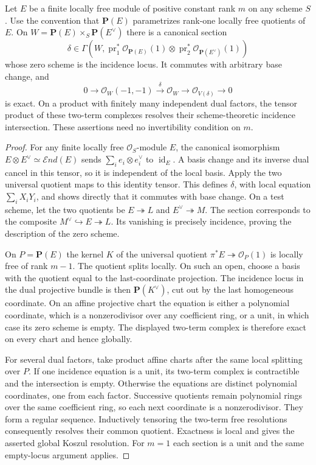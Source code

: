 \begin{lemma}\label{C:determinant-incidence}
Let $E$ be a finite locally free module of positive constant rank
$m$ on any scheme $S$.  Use the convention that $\mathbf P(E)$
parametrizes rank-one locally free quotients of $E$.
On $W=\mathbf P(E)\times_S\mathbf P(E^\vee)$ there is a canonical
section
\[
 \delta\in\Gamma(W,
  \operatorname{pr}_1^*\mathcal O_{\mathbf P(E)}(1)
  \otimes\operatorname{pr}_2^*\mathcal O_{\mathbf P(E^\vee)}(1))
\]
whose zero scheme is the incidence locus.  It commutes with arbitrary
base change, and
\[
 0\longrightarrow\mathcal O_W(-1,-1)
       \xrightarrow{\ \delta\ }\mathcal O_W
       \longrightarrow\mathcal O_{V(\delta)}\longrightarrow0
\]
is exact.  On a product with finitely many independent dual factors,
the tensor product of these two-term complexes resolves their
scheme-theoretic incidence intersection.  These assertions need
no invertibility condition on $m$.
\end{lemma}
\begin{proof}
For any finite locally free $\mathcal O_S$-module $E$, the canonical
isomorphism $E\otimes E^\vee\simeq\mathcal{E}nd(E)$ sends
$\sum_i e_i\otimes e_i^\vee$ to $\operatorname{id}_E$.
A basis change and its inverse dual cancel in this tensor, so it
is independent of the local basis.  Apply the two universal quotient
maps to this identity tensor.  This defines $\delta$, with local
equation $\sum_iX_iY_i$, and shows directly that it commutes with
base change.  On a test scheme, let the two quotients be
$E\twoheadrightarrow L$ and $E^\vee\twoheadrightarrow M$.
The section corresponds to the composite
$M^\vee\hookrightarrow E\twoheadrightarrow L$.
Its vanishing is precisely incidence, proving the description of
the zero scheme.

On $P=\mathbf P(E)$ the kernel $K$ of the universal quotient
$\pi^*E\twoheadrightarrow\mathcal O_P(1)$ is locally free of
rank $m-1$.  The quotient splits locally.  On such an open, choose
a basis with the quotient equal to the last-coordinate projection.
The incidence locus in the dual projective bundle is then
$\mathbf P(K^\vee)$, cut out by the last homogeneous coordinate.
On an affine projective chart the equation is either a polynomial
coordinate, which is a nonzerodivisor over any coefficient ring,
or a unit, in which case its zero scheme is empty.  The displayed
two-term complex is therefore exact on every chart and hence globally.

For several dual factors, take product affine charts after the same
local splitting over $P$.  If one incidence equation is a unit,
its two-term complex is contractible and the intersection is empty.
Otherwise the equations are distinct polynomial coordinates, one
from each factor.  Successive quotients remain polynomial rings
over the same coefficient ring, so each next coordinate is a
nonzerodivisor.  They form a regular sequence.  Inductively tensoring
the two-term free resolutions consequently resolves their common
quotient.  Exactness is local and gives the asserted global Koszul
resolution.  For $m=1$ each section is a unit and the same empty-locus
argument applies.
\end{proof}

